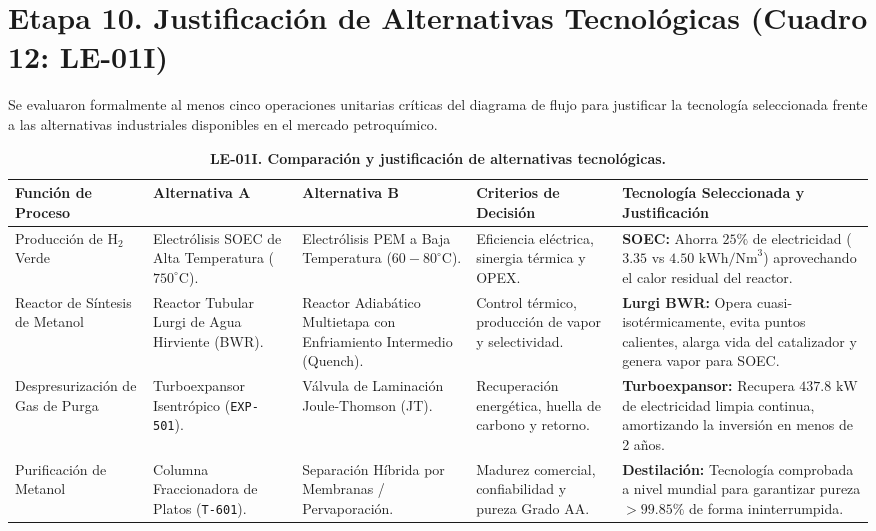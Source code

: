 \documentclass[10pt,letterpaper]{article}
\begin{document}
\section{Etapa 10. Justificación de Alternativas Tecnológicas (Cuadro 12: LE-01I)}

Se evaluaron formalmente al menos cinco operaciones unitarias críticas del diagrama de flujo para justificar la tecnología seleccionada frente a las alternativas industriales disponibles en el mercado petroquímico.

\begin{table}[H]
\centering
\small
\setlength{\tabcolsep}{3.5pt}
\caption{\textbf{LE-01I. Comparación y justificación de alternativas tecnológicas.}} \label{tab:cuadro12}
\begin{tabularx}{\textwidth}{>{\raggedright\arraybackslash}p{2.35cm} >{\raggedright\arraybackslash}p{2.45cm} >{\raggedright\arraybackslash}p{2.45cm} >{\raggedright\arraybackslash}p{2.15cm} X}
\toprule
\textbf{Función de Proceso} & \textbf{Alternativa A} & \textbf{Alternativa B} & \textbf{Criterios de Decisión} & \textbf{Tecnología Seleccionada y Justificación} \\
\midrule
Producción de $\text{H}_2$ Verde & Electrólisis SOEC de Alta Temperatura ($750^\circ\text{C}$). & Electrólisis PEM a Baja Temperatura ($60-80^\circ\text{C}$). & Eficiencia eléctrica, sinergia térmica y OPEX. & \textbf{SOEC:} Ahorra $25\%$ de electricidad ($3.35$ vs $4.50\text{ kWh/Nm}^3$) aprovechando el calor residual del reactor. \\
Reactor de Síntesis de Metanol & Reactor Tubular Lurgi de Agua Hirviente (BWR). & Reactor Adiabático Multietapa con Enfriamiento Intermedio (Quench). & Control térmico, producción de vapor y selectividad. & \textbf{Lurgi BWR:} Opera cuasi-isotérmicamente, evita puntos calientes, alarga vida del catalizador y genera vapor para SOEC. \\
Des\-pre\-su\-ri\-za\-ción de Gas de Purga & Turboexpansor Isentrópico (\texttt{EXP-501}). & Válvula de Laminación Joule-Thomson (JT). & Recuperación energética, huella de carbono y retorno. & \textbf{Turboexpansor:} Recupera $437.8\text{ kW}$ de electricidad limpia continua, amortizando la inversión en menos de 2 años. \\
Purificación de Metanol & Columna Fraccionadora de Platos (\texttt{T-601}). & Separación Híbrida por Membranas / Pervaporación. & Madurez comercial, confiabilidad y pureza Grado AA. & \textbf{Destilación:} Tecnología comprobada a nivel mundial para garantizar pureza $>99.85\%$ de forma ininterrumpida. \\

\end{tabularx}
\end{table}
\end{document}
